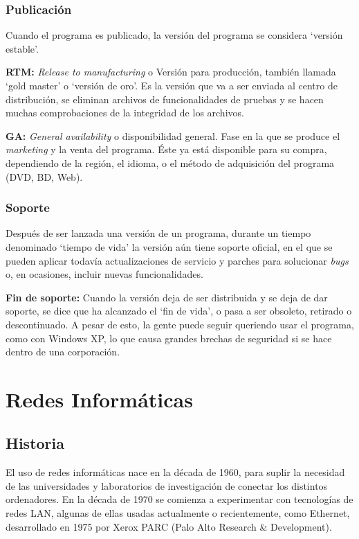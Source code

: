 \documentclass[a4paper, 11pt]{report} %
\begin{document}
\newpage
\subsection{Publicación}
Cuando el programa es publicado, la versión del programa se considera `versión estable'.
\begin{description}
\item \textbf{RTM:} \textit{Release to manufacturing} o Versión para producción, también llamada `gold master' o `versión de oro'.  Es la versión que va a ser enviada al centro de distribución, se eliminan archivos de funcionalidades de pruebas y se hacen muchas comprobaciones de la integridad de los archivos.
\item \textbf{GA:} \textit{General availability} o disponibilidad general. Fase en la que se produce el \textit{marketing} y la venta del programa. Éste ya está disponible para su compra, dependiendo de la región, el idioma, o el método de adquisición del programa (DVD, BD, Web).
\end{description}
\subsection{Soporte}
Después de ser lanzada una versión de un programa, durante un tiempo denominado `tiempo de vida' la versión aún tiene soporte oficial, en el que se pueden aplicar todavía actualizaciones de servicio y parches para solucionar \textit{bugs} o, en ocasiones, incluir nuevas funcionalidades.
\begin{description}
\item \textbf{Fin de soporte:} Cuando la versión deja de ser distribuida y se deja de dar soporte, se dice que ha alcanzado el `fin de vida', o pasa a ser obsoleto, retirado o descontinuado. A pesar de esto, la gente puede seguir queriendo usar el programa, como con Windows XP, lo que causa grandes brechas de seguridad si se hace dentro de una corporación.
\end{description}

\chapter{Redes Informáticas}
\section*{Historia}
El uso de redes informáticas nace en la década de 1960, para suplir la necesidad de las universidades y laboratorios de investigación de conectar los distintos ordenadores. En la década de 1970 se comienza a experimentar con tecnologías de redes LAN, algunas de ellas usadas actualmente o recientemente, como Ethernet, desarrollado en 1975 por Xerox PARC (Palo Alto Research \& Development). 
\end{document}
